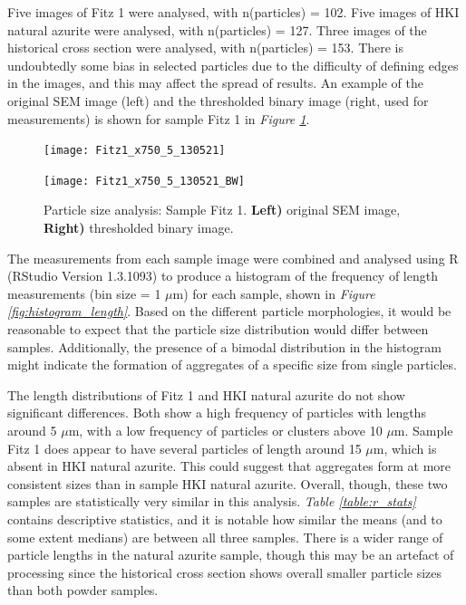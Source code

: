 Five images of Fitz 1 were analysed, with n(particles) = 102. Five images of HKI natural azurite were analysed, with n(particles) = 127. Three images of the historical cross section were analysed, with n(particles) = 153. There is undoubtedly some bias in selected particles due to the difficulty of defining edges in the images, and this may affect the spread of results. An example of the original SEM image (left) and the thresholded binary image (right, used for measurements) is shown for sample Fitz 1 in \textit{Figure \ref{fig:imageJ_fitz1}}.

\begin{figure}[H]
\centering
\begin{minipage}{.45\textwidth}
  \centering
  \texttt{[image: Fitz1\_x750\_5\_130521]}
\end{minipage}
\begin{minipage}{.45\textwidth}
  \centering
  \texttt{[image: Fitz1\_x750\_5\_130521\_BW]}
\end{minipage}
\caption[Particle size analysis: Sample Fitz 1]{Particle size analysis: Sample Fitz 1. \textbf{Left)} original SEM image, \textbf{Right)} thresholded binary image.}
\label{fig:imageJ_fitz1}
\end{figure}

The measurements from each sample image were combined and analysed using R (RStudio Version 1.3.1093) to produce a histogram of the frequency of length measurements (bin size = 1 $\mu$m) for each sample, shown in \textit{Figure \ref{fig:histogram_length}}. Based on the different particle morphologies, it would be reasonable to expect that the particle size distribution would differ between samples. Additionally, the presence of a bimodal distribution in the histogram might indicate the formation of aggregates of a specific size from single particles. 

The length distributions of Fitz 1 and HKI natural azurite do not show significant differences. Both show a high frequency of particles with lengths around 5 $\mu$m, with a low frequency of particles or clusters above 10 $\mu$m. Sample Fitz 1 does appear to have several particles of length around 15 $\mu$m, which is absent in HKI natural azurite. This could suggest that aggregates form at more consistent sizes than in sample HKI natural azurite. Overall, though, these two samples are statistically very similar in this analysis. \textit{Table \ref{table:r_stats}} contains descriptive statistics, and it is notable how similar the means (and to some extent medians) are between all three samples. There is a wider range of particle lengths in the natural azurite sample, though this may be an artefact of processing since the historical cross section shows overall smaller particle sizes than both powder samples. 

